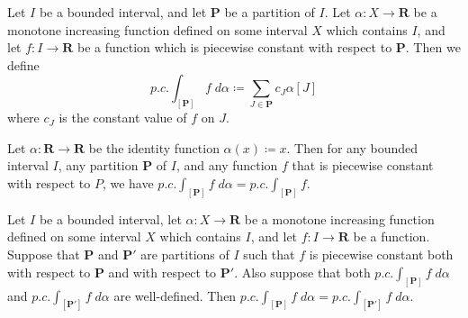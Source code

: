 \begin{definition}\label{11.8.5}
    Let \(I\) be a bounded interval, and let \(\mathbf{P}\) be a partition of \(I\).
    Let \(\alpha : X \to \mathbf{R}\) be a monotone increasing function defined on some interval \(X\) which contains \(I\), and let \(f : I \to \mathbf{R}\) be a function which is piecewise constant with respect to \(\mathbf{P}\).
    Then we define
    \[
        p.c. \int_{[\mathbf{P}]} f \; d \alpha \coloneqq \sum_{J \in \mathbf{P}} c_J \alpha[J]
    \]
    where \(c_J\) is the constant value of \(f\) on \(J\).
\end{definition}

\setcounter{theorem}{6}
\begin{example}\label{11.8.7}
    Let \(\alpha : \mathbf{R} \to \mathbf{R}\) be the identity function \(\alpha(x) \coloneqq x\).
    Then for any bounded interval \(I\), any partition \(\mathbf{P}\) of \(I\), and any function \(f\) that is piecewise constant with respect to \(P\), we have \(p.c. \int_{[\mathbf{P}]} f \; d \alpha = p.c. \int_{[\mathbf{P}]} f\).
\end{example}

\begin{additional corollary}\label{ac 11.8.3}
Let \(I\) be a bounded interval, let \(\alpha : X \to \mathbf{R}\) be a monotone increasing function defined on some interval \(X\) which contains \(I\), and let \(f : I \to \mathbf{R}\) be a function.
Suppose that \(\mathbf{P}\) and \(\mathbf{P}'\) are partitions of \(I\) such that \(f\) is piecewise constant both with respect to \(\mathbf{P}\) and with respect to \(\mathbf{P}'\).
Also suppose that both \(p.c. \int_{[\mathbf{P}]} f \; d \alpha\) and \(p.c. \int_{[\mathbf{P}']} f \; d \alpha\) are well-defined.
Then \(p.c. \int_{[\mathbf{P}]} f \; d \alpha = p.c. \int_{[\mathbf{P}']} f \; d \alpha\).
\end{additional corollary}

